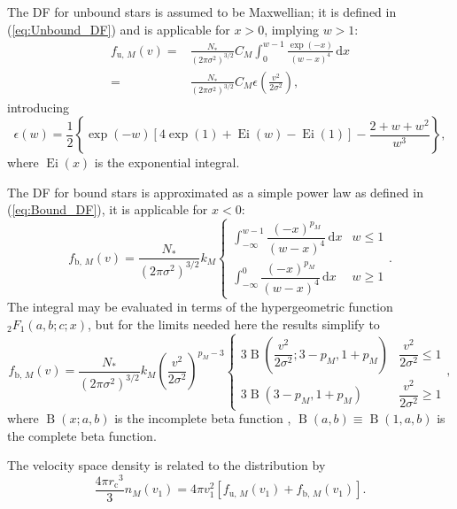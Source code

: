 \documentclass[useAMS,usedcolumn,usegraphicx,usenatbib]{mn2e}
\newcommand{\eqnref}[1]{(\ref{eq:#1})}
\DeclareMathOperator{\Ei}{Ei}
\DeclareMathOperator{\Beta}{B}
\newcommand{\sub}[1]{\ensuremath{_\mathrm{#1}}}
\newcommand{\dd}{\ensuremath{\mathrm{d}}}
\newcommand{\intd}[4]{\ensuremath{\displaystyle \int_{#1}^{#2}{#3}\,\dd{#4}}}
\newcommand{\recip}[1]{\ensuremath{\dfrac{1}{#1}}}
\begin{document}
\begin{onecolumn}
The DF for unbound stars is assumed to be Maxwellian; it is defined in \eqnref{Unbound_DF} and is applicable for $x > 0$, implying $w > 1$:
\begin{align}
f_{\mathrm{u},\,M}(v) = {} & \frac{N_\ast}{\left(2\pi\sigma^2\right)^{3/2}}C_M \intd{0}{w-1}{\frac{\exp(-x)}{(w-x)^4}}{x} \\
 = {} & \frac{N_\ast}{\left(2\pi\sigma^2\right)^{3/2}}C_M\epsilon\left(\frac{v^2}{2\sigma^2}\right),
\end{align}
introducing
\begin{equation}
\epsilon(w) = \recip{2}\left\{\exp(-w)\left[4\exp(1) + \Ei(w) - \Ei(1)\right] - \frac{2 + w + w^2}{w^3}\right\},
\end{equation}
where $\Ei(x)$ is the exponential integral.

The DF for bound stars is approximated as a simple power law as defined in \eqnref{Bound_DF}, it is applicable for $x < 0$:
\begin{equation}
f_{\mathrm{b},\,M}(v) = \frac{N_\ast}{\left(2\pi\sigma^2\right)^{3/2}}k_M\begin{cases}
\intd{-\infty}{w-1}{\dfrac{(-x)^{p_M}}{(w-x)^4}}{x} & w \leq 1 \\
\intd{-\infty}{0}{\dfrac{(-x)^{p_M}}{(w-x)^4}}{x} & w \geq 1
\end{cases}.
\end{equation}
The integral may be evaluated in terms of the hypergeometric function ${_2F_1(a,b;c;x)}$, but for the limits needed here the results simplify to
\begin{equation}
f_{\mathrm{b},\,M}(v) = \frac{N_\ast}{\left(2\pi\sigma^2\right)^{3/2}}k_M \left(\frac{v^2}{2\sigma^2}\right)^{p_M - 3}\begin{cases}
3 \Beta\left(\dfrac{v^2}{2\sigma^2}; 3 - p_M, 1 + p_M\right) & \dfrac{v^2}{2\sigma^2} \leq 1 \\
3 \Beta\left(3 - p_M, 1 + p_M\right) & \dfrac{v^2}{2\sigma^2} \geq 1
\end{cases},
\end{equation}
where $\Beta(x;a,b)$ is the incomplete beta function \citep[8.17]{Olver2010}, $\Beta(a,b) \equiv \Beta(1,a,b)$ is the complete beta function.

The velocity space density is related to the distribution by
\begin{equation}
\frac{4\pi r\sub{c}^3}{3}n_M(v_1) = 4\pi v_1^2\left[f_{\mathrm{u},\,M}(v_1) + f_{\mathrm{b},\,M}(v_1)\right].
\end{equation}


\end{onecolumn}
\end{document}
